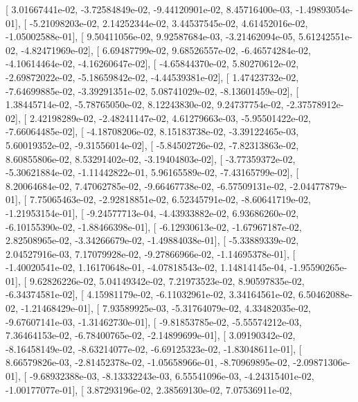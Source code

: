 \documentclass{article}
\begin{document}
       [  3.01667441e-02,  -3.72584849e-02,  -9.44120901e-02,
          8.45716400e-03,  -1.49893054e-01],
       [ -5.21098203e-02,   2.14252344e-02,   3.44537545e-02,
          4.61452016e-02,  -1.05002588e-01],
       [  9.50411056e-02,   9.92587684e-03,  -3.21462094e-05,
          5.61242551e-02,  -4.82471969e-02],
       [  6.69487799e-02,   9.68526557e-02,  -6.46574284e-02,
         -4.10614464e-02,  -4.16260647e-02],
       [ -4.65844370e-02,   5.80270612e-02,  -2.69872022e-02,
         -5.18659842e-02,  -4.44539381e-02],
       [  1.47423732e-02,  -7.64699885e-02,  -3.39291351e-02,
          5.08741029e-02,  -8.13601459e-02],
       [  1.38445714e-02,  -5.78765050e-02,   8.12243830e-02,
          9.24737754e-02,  -2.37578912e-02],
       [  2.42198289e-02,  -2.48241147e-02,   4.61279663e-03,
         -5.95501422e-02,  -7.66064485e-02],
       [ -4.18708206e-02,   8.15183738e-02,  -3.39122465e-03,
          5.60019352e-02,  -9.31556014e-02],
       [ -5.84502726e-02,  -7.82313863e-02,   8.60855806e-02,
          8.53291402e-02,  -3.19404803e-02],
       [ -3.77359372e-02,  -5.30621884e-02,  -1.11442822e-01,
          5.96165589e-02,  -7.43165799e-02],
       [  8.20064684e-02,   7.47062785e-02,  -9.66467738e-02,
         -6.57509131e-02,  -2.04477879e-01],
       [  7.75065463e-02,  -2.92818851e-02,   6.52345791e-02,
         -8.60641719e-02,  -1.21953154e-01],
       [ -9.24577713e-04,  -4.43933882e-02,   6.93686260e-02,
         -6.10155390e-02,  -1.88466398e-01],
       [ -6.12930613e-02,  -1.67967187e-02,   2.82508965e-02,
         -3.34266679e-02,  -1.49884038e-01],
       [ -5.33889339e-02,   2.04527916e-03,   7.17079928e-02,
         -9.27866966e-02,  -1.14695378e-01],
       [ -1.40020541e-02,   1.16170648e-01,  -4.07818543e-02,
          1.14814145e-04,  -1.95590265e-01],
       [  9.62826226e-02,   5.04149342e-02,   7.21973523e-02,
          8.90597835e-02,  -6.34374581e-02],
       [  4.15981179e-02,  -6.11032961e-02,   3.34164561e-02,
          6.50462088e-02,  -1.21468429e-01],
       [  7.93589925e-03,  -5.31764079e-02,   4.33482035e-02,
         -9.67607141e-03,  -1.31462730e-01],
       [ -9.81853785e-02,  -5.55574212e-03,   7.36464153e-02,
         -6.78400765e-02,  -2.14899699e-01],
       [  3.09190342e-02,  -8.16458149e-02,  -8.63214077e-02,
         -6.69125323e-02,  -1.83048611e-01],
       [  8.66579826e-03,  -2.81452378e-02,  -1.05658966e-01,
         -8.70969895e-02,  -2.09871306e-01],
       [ -9.68932388e-03,  -8.13332243e-03,   6.55541096e-03,
         -4.24315401e-02,  -1.00177077e-01],
       [  3.87293196e-02,   2.38569130e-02,   7.07536911e-02,
\end{document}

